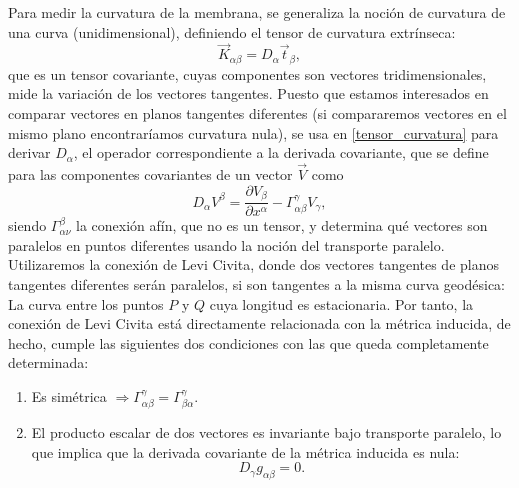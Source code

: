 Para medir la curvatura de la membrana, se generaliza la noción de curvatura
de una curva (unidimensional), definiendo el tensor de curvatura extrínseca:
\begin{equation}\label{tensor_curvatura}
\vec{K}_{\alpha\beta}=D_{\alpha}\vec{t}_{\beta},
\end{equation}
que es un tensor covariante, cuyas componentes son vectores
tridimensionales, mide la variación de los vectores tangentes. Puesto que
estamos interesados en comparar vectores en planos tangentes
diferentes (si compararemos vectores en el mismo plano encontraríamos
curvatura nula), se usa en \eqref{tensor_curvatura} para derivar $D_{\alpha}$,
el operador correspondiente a la derivada covariante, que se define para las
componentes covariantes de un vector $\vec{V}$ como
\begin{equation}\label{derivada_covariante}
D_{\alpha}V^{\beta}=\frac{\partial V_{\beta}}{\partial x^{\alpha}}-\Gamma^{\gamma}_{\alpha\beta}V_{\gamma},
\end{equation}
siendo $\Gamma^{\beta}_{\alpha\nu}$ la conexión afín, que no es un tensor, y
determina qué vectores son paralelos en puntos diferentes usando la noción del transporte
paralelo. Utilizaremos la conexión de Levi Civita, donde dos vectores
tangentes de planos tangentes diferentes serán paralelos, si son tangentes a la
misma curva geodésica: La curva entre los puntos $P$ y $Q$ cuya longitud es
estacionaria. Por tanto, la conexión de Levi Civita está directamente
relacionada con la métrica inducida, de hecho, cumple las siguientes dos condiciones
con las que queda completamente determinada:
\begin{enumerate}
\item Es simétrica $\Rightarrow
  \Gamma^{\gamma}_{\alpha\beta}=\Gamma^{\gamma}_{\beta\alpha}$.
\item El producto escalar de dos vectores es invariante bajo transporte
  paralelo, lo que implica que la derivada covariante de la métrica inducida
  es nula: 
  \begin{equation*}
    D_{\gamma}g_{\alpha\beta}=0.
  \end{equation*}
\end{enumerate}

